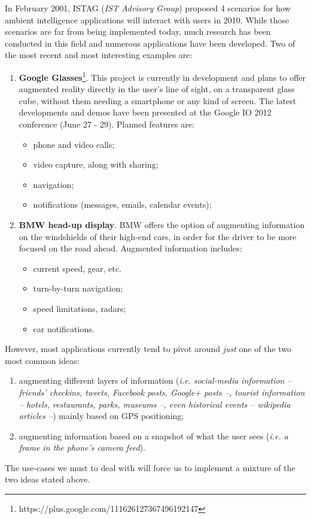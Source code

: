 \documentclass[a4paper,onecolumn,oneside,titlepage,11pt]{report}
\begin{document}
In February 2001, ISTAG (\emph{IST Advisory Group}) proposed 4 scenarios for how ambient intelligence applications will interact with users in 2010\cite{ist01}. While those scenarios are far from being implemented today, much research has been conducted in this field and numerous applications have been developed.
Two of the most recent and most interesting examples are:
\begin{enumerate}
	\item \textbf{Google Glasses}\footnote{https://plus.google.com/111626127367496192147}. This project is currently in development and plans to offer augmented reality directly in the user's line of sight, on a transparent glass cube, without them needing a smartphone or any kind of screen. The latest developments and demos have been presented at the Google IO 2012 conference (June 27 - 29). Planned features are:
	\begin{itemize}
		\item phone and video calls;
		\item video capture, along with sharing;
		\item navigation;
		\item notifications (messages, emails, calendar events);
	\end{itemize}
	\item \textbf{BMW head-up display}. BMW offers the option of augmenting information on the windshields of their high-end cars, in order for the driver to be more focused on the road ahead. Augmented information includes:
	\begin{itemize}
		\item current speed, gear, etc.
		\item turn-by-turn navigation;
		\item speed limitations, radars;
		\item car notifications.
	\end{itemize}
\end{enumerate}
However, most applications currently tend to pivot around \emph{just} one of the two most common ideas:
\begin{enumerate}
	\item augmenting different layers of information (\emph{i.e. social-media information -- friends' checkins, tweets, Facebook posts, Google+ posts --, tourist information -- hotels, restaurants, parks, museums --, even historical events -- wikipedia articles --}) mainly based on GPS positioning;
	\item augmenting information based on a snapshot of what the user sees (\emph{i.e. a frame in the phone's camera feed}).
\end{enumerate}
The use-cases we must to deal with will force us to implement a mixture of the two ideas stated above.
\end{document}
